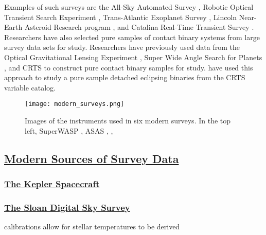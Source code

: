 \documentclass[12pt]{article} %
\numberwithin{equation}{section} %
\begin{document}
Examples of such surveys are the All-Sky Automated Survey \citep[ASAS,][]{pojmanski2000all}, Robotic Optical Transient Search Experiment \citep[ROTSE,][]{akerlof2000rotse}, Trans-Atlantic Exoplanet Survey \citep[TrES,][]{devor2008identification}, Lincoln Near-Earth Asteroid Research program \citep[LINEAR,][]{palaversa2013exploring}, and Catalina Real-Time Transient Survey \citep[CRTS,][]{drake2014catalina}. Researchers have also selected pure samples of contact binary systems from large survey data sets for study. Researchers have previously used data from the Optical Gravitational Lensing Experiment \citep[OGLE,][]{rucinski1996eclipsing}, Super Wide Angle Search for Planets \citep[SuperWASP,][]{norton2011short}, and CRTS \citep{drake2014ultra} to construct pure contact binary samples for study. \citet{lee2015properties} have used this approach to study a pure sample detached eclipsing binaries from the CRTS variable catalog. 

\begin{figure}[H]
\centering
\texttt{[image: modern\_surveys.png]}
\caption{Images of the instruments used in six modern surveys. In the top left, SuperWASP \citep[SuperWASP,][]{norton2011short}, ASAS \citep[ASAS,][]{pojmanski2000all}, \citep[ROTSE,][]{akerlof2000rotse},  }
\label{fig: modern_surveys}
\end{figure}


\subsection[Modern Sources of Survey Data]{\hyperlink{toc}{Modern Sources of Survey Data}}

\subsubsection[The Kepler Spacecraft]{\hyperlink{toc}{The Kepler Spacecraft}}

\subsubsection[The Sloan Digital Sky Survey]{\hyperlink{toc}{The Sloan Digital Sky Survey}}

\cite{york2000sloan}

\citep{ivezic2007sloan} 

calibrations allow for stellar temperatures to be derived \cite{fukugita2011characterization}
\end{document}
